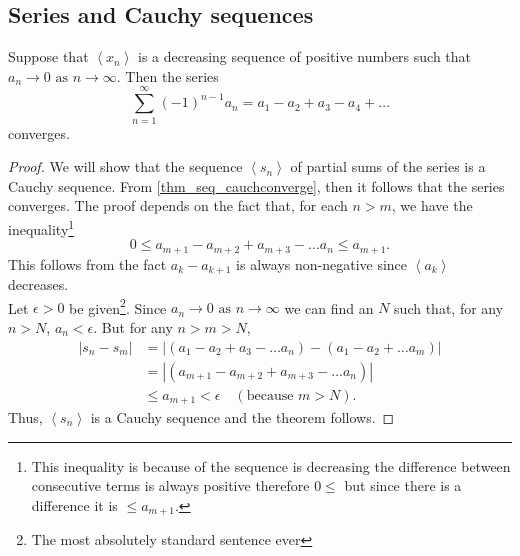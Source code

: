 \documentclass[10pt, a4paper]{article}
\newcommand{\limas}[3][n]{#2 \rightarrow #3 \text{ as } #1 \rightarrow \infty}
\newcommand{\sumfrto}[3][n = 1]{\sum_{#1}^{#2}{#3}} %
\newcommand{\sumto}[2][\infty]{\sumfrto{#1}{#2}}
\newcommand{\seq}[1][x_n]{\left\langle #1 \right\rangle}
\begin{document}
\subsection{Series and Cauchy sequences}

\begin{theorem}\label{thm_series_altconv}
    Suppose that $\seq$ is a decreasing sequence of positive numbers such that $\limas{a_n}{0}$. Then the series
    \[
    \sumto{(-1) ^ {n - 1} a_n} = a_1 - a_2 + a_3 - a_4 + \dotsc
    \]
    converges.
    \begin{proof}
        We will show that the sequence $\seq[s_n]$ of partial sums of the series is a Cauchy sequence. From \autoref{thm_seq_cauchconverge}, then it follows that the series converges. The proof depends on the fact that, for each $n > m$, we have the inequality\footnote{This inequality is because of the sequence is decreasing the difference between consecutive terms is always positive therefore $0 \leq$ but since there is a difference it is $\leq a_{m + 1}$.}
        \[
        0 \leq a_{m + 1} - a_{m + 2} + a_{m + 3} - \dotsc a_n \leq a_{m + 1}.
        \]
        This follows from the fact $a_k - a_{k + 1}$ is always non-negative since $\seq[a_k]$ decreases. \\
        Let $\epsilon > 0$ be given\footnote{The most absolutely standard sentence ever}. Since $\limas{a_n}{0}$ we can find an $N$ such that, for any $n > N$, $a_n < \epsilon$. But for any $n > m > N$,
        \begin{align*}
            |s_n - s_m| &= |(a_1 - a_2 + a_3 - \dotsc a_n) - (a_1 - a_2 + \dotsc a_m)| \\
            &= |(a_{m + 1} - a_{m + 2} + a_{m + 3} - \dotsc a_n)| \\
            &\leq a_{m + 1} < \epsilon \quad(\text{because } m > N).
        \end{align*}
        Thus, $\seq[s_n]$ is a Cauchy sequence and the theorem follows.
    \end{proof}
\end{theorem}
\end{document}
